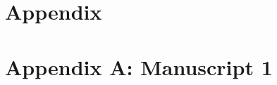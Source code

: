 \documentclass[a4paper, twoside, nobib]{tufte-book}
\begin{document}
\appendix

\part*{Appendix}
\label{appendix}

\part*{Appendix A: Manuscript 1}
\label{paper-1}


 
% 
% 
% 
\end{document}
